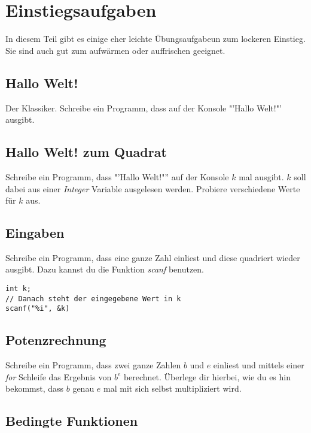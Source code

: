 \documentclass[c_worksheet.tex]{subfiles}
\begin{document}
\chapter{Einstiegsaufgaben}

In diesem Teil gibt es einige eher leichte Übungsaufgabeun zum lockeren Einstieg. Sie sind auch gut zum aufwärmen oder auffrischen geeignet.


\section{Hallo Welt!}

Der Klassiker. Schreibe ein Programm, dass auf der Konsole "'Hallo Welt!"' ausgibt.


\section{Hallo Welt! zum Quadrat}

Schreibe ein Programm, dass "'Hallo Welt!"'' auf der Konsole \(k\) mal ausgibt. \(k\) soll dabei aus einer \emph{Integer} Variable ausgelesen werden. Probiere verschiedene Werte für \(k\) aus.


\section{Eingaben}

Schreibe ein Programm, dass eine ganze Zahl einliest und diese quadriert wieder ausgibt. Dazu kannst du die Funktion \emph{scanf} benutzen.

\begin{lstlisting}
int k;
// Danach steht der eingegebene Wert in k
scanf("%i", &k) 
\end{lstlisting}


\section{Potenzrechnung}

Schreibe ein Programm, dass zwei ganze Zahlen \(b\) und \(e\) einliest und mittels einer \emph{for} Schleife das Ergebnis von \(b^e\) berechnet. Überlege dir hierbei, wie du es hin bekommst, dass \(b\) genau \(e\) mal mit sich selbst multipliziert wird.  


\section{Bedingte Funktionen} 
\end{document}
